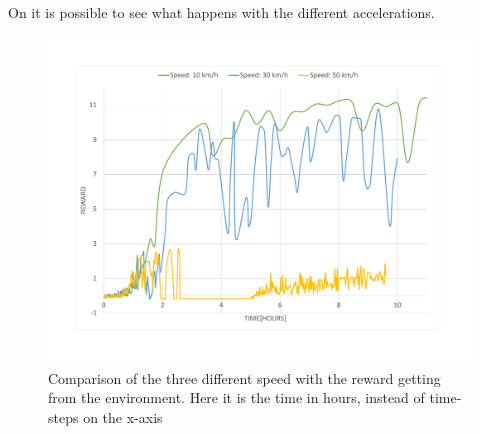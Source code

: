 On  it is possible to see what happens with the different accelerations.   
 
\begin{figure}[H]
	\centering
	\includegraphics[width=1\textwidth]{Figures/Result/change_of_acceleration_reward_hours_graph.pdf}
	\caption{Comparison of the three different speed with the reward getting from the environment. Here it is the time in hours, instead of time-steps on the x-axis}
	\label{fig:change_of_acceleration_reward_hours_graph}
\end{figure}
  